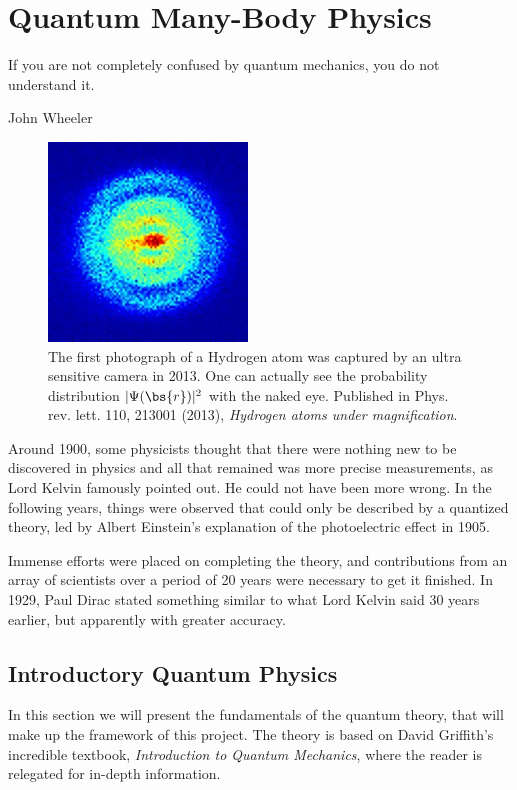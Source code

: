 \chapter{Quantum Many-Body Physics} \label{chp:quantum}
\epigraph{If you are not completely confused by quantum mechanics, you do not understand it.}{John Wheeler}
\begin{figure}[H]
	\centering
	\captionsetup[subfigure]{labelformat=empty}
	\includegraphics[scale=3.0]{Images/art_quantum.jpg}
	\caption{The first photograph of a Hydrogen atom was captured by an ultra sensitive camera in 2013. One can actually see the probability distribution $|\Psi(\bs{r})|^2$ with the naked eye. Published in Phys. rev. lett. 110, 213001 (2013), \textit{Hydrogen atoms under magnification}. \cite{stodolna_hydrogen_2013}}
\end{figure}
Around 1900, some physicists thought that there were nothing new to be discovered in physics and all that remained was more precise measurements, as Lord Kelvin famously pointed out. \cite{weisstein_kelvin_2007} He could not have been more wrong. In the following years, things were observed that could only be described by a quantized theory, led by Albert Einstein's explanation of the photoelectric effect in 1905. 

Immense efforts were placed on completing the theory, and contributions from an array of scientists over a period of 20 years were necessary to get it finished. In 1929, Paul Dirac stated something similar to what Lord Kelvin said 30 years earlier, but apparently with greater accuracy. 

\newpage
\section{Introductory Quantum Physics} \label{subsec:elementary}
In this section we will present the fundamentals of the quantum theory, that will make up the framework of this project. The theory is based on David Griffith's incredible textbook, \textit{Introduction to Quantum Mechanics}, where the reader is relegated for in-depth information.

